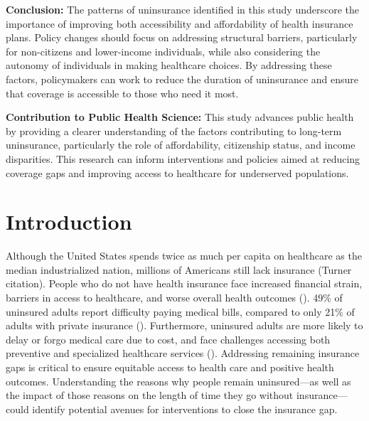 \documentclass[12pt]{article}
\begin{document}
\textbf{Conclusion:} The patterns of uninsurance identified in this study underscore the importance of improving both accessibility and affordability of health insurance plans. Policy changes should focus on addressing structural barriers, particularly for non-citizens and lower-income individuals, while also considering the autonomy of individuals in making healthcare choices. By addressing these factors, policymakers can work to reduce the duration of uninsurance and ensure that coverage is accessible to those who need it most.

\textbf{Contribution to Public Health Science:} This study advances public health by providing a clearer understanding of the factors contributing to long-term uninsurance, particularly the role of affordability, citizenship status, and income disparities. This research can inform interventions and policies aimed at reducing coverage gaps and improving access to healthcare for underserved populations.


\newpage
\section{Introduction}

Although the United States spends twice as much per capita on healthcare as the median industrialized nation, millions of Americans still lack insurance (Turner citation). People who do not have health insurance face increased financial strain, barriers in access to healthcare, and worse overall health outcomes (\cite{davis_uninsured_2007}). 49\% of uninsured adults report difficulty paying medical bills, compared to only 21\% of adults with private insurance (\cite{tolbert_key_2024}). Furthermore, uninsured adults are more likely to delay or forgo medical care due to cost, and face challenges accessing both preventive and specialized healthcare services (\cite{cha_reasons_2020, erly_characterization_2022}). Addressing remaining insurance gaps is critical to ensure equitable access to health care and positive health outcomes. Understanding the reasons why people remain uninsured—as well as the impact of those reasons on the length of time they go without insurance—could identify potential avenues for interventions to close the insurance gap.
\end{document}
